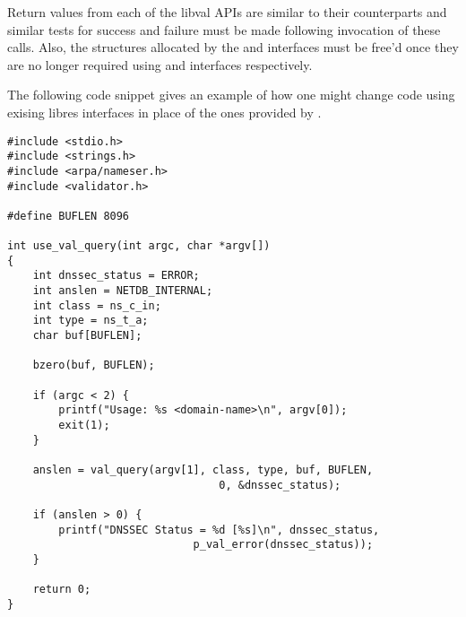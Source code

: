 Return values from each of the libval APIs are similar to their 
counterparts and similar tests for success and failure must be made following invocation
of these calls. Also, the structures allocated by the 
and  interfaces
must be free'd once they are no longer required using  and
 interfaces respectively.
                                                                                                                             
The following code snippet gives an example of how one might change code using exising
libres interfaces in place of the ones provided by .

\begin{verbatim}                      
#include <stdio.h>
#include <strings.h>
#include <arpa/nameser.h>
#include <validator.h>

#define BUFLEN 8096
                                                                                                                             
int use_val_query(int argc, char *argv[])
{
    int dnssec_status = ERROR;
    int anslen = NETDB_INTERNAL;
    int class = ns_c_in;
    int type = ns_t_a;
    char buf[BUFLEN];
                                                                                                                             
    bzero(buf, BUFLEN);
                                                                                                                             
    if (argc < 2) {
        printf("Usage: %s <domain-name>\n", argv[0]);
        exit(1);
    }
                                                                                                                             
    anslen = val_query(argv[1], class, type, buf, BUFLEN,
                                 0, &dnssec_status);
                                                                                                                             
    if (anslen > 0) {
        printf("DNSSEC Status = %d [%s]\n", dnssec_status,
                             p_val_error(dnssec_status));
    }
                                                                                                                             
    return 0;
}


\end{verbatim}

